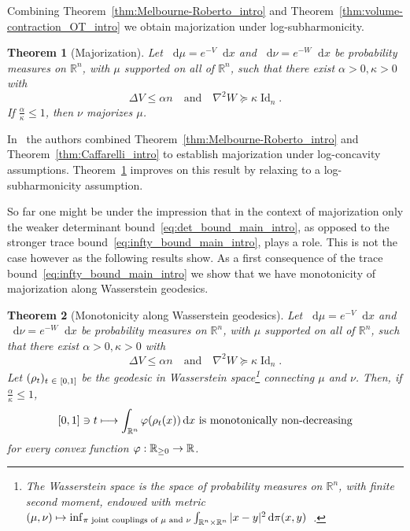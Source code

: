 \documentclass[10pt]{amsart}
\newtheorem{theo}{Theorem}[section]
\theoremstyle{definition}\newtheorem{defi}[theo]{Definition}\newtheorem{rema}[theo]{Remark}\newtheorem{exam}[theo]{Example}\newtheorem{exem}[theo]{Example}\newtheorem{nota}[theo]{Notation}
\newcommand{\R}{\mathbb R}
\DeclareMathOperator{\Id}{Id}
\newcommand{\V}{V}
\newcommand{\W}{W}
\newcommand{\dd}{n}
\newcommand{\prob}{\rho}
\newcommand{\source}{\mu}
\newcommand{\target}{\nu}
\newcommand{\lsh}{\alpha}
\newcommand{\lc}{\kappa}
\newcommand*\diff{\mathop{}\!\mathrm{d}}
\newcommand{\cxfun}{\varphi}
\renewcommand*{\to}{\mathchoice{\longrightarrow}{\rightarrow}{\rightarrow}{\rightarrow}}
\let\oldmapsto\mapsto
\renewcommand*{\mapsto}{\mathchoice{\longmapsto}{\oldmapsto}{\oldmapsto}{\oldmapsto}}
\let\oldin\in
\renewcommand{\in}{\mathchoice{\oldin}{\oldin}{\,\oldin\,}{\,\oldin\,}}
\begin{document}
Combining Theorem~\ref{thm:Melbourne-Roberto_intro} and Theorem~\ref{thm:volume-contraction_OT_intro} we obtain majorization under log-subharmonicity.

\begin{theo}[Majorization]\label{thm:majorization_intro}
Let $\diff\source=e^{-\V}\diff x$ and $\diff\target=e^{-\W}\diff x$ be probability measures on $\R^{\dd}$, with $\source$ supported on all of $\R^{\dd}$, such that there exist $\lsh>0,\lc>0$ with
\[
\Delta \V \le \lsh\dd \quad\text{and}\quad \nabla^2\W \succeq \lc \Id_{\dd}.
\]
If $\frac{\lsh}{\lc}\le 1$, then $\target$ majorizes $\source$.
\end{theo}

In~\cite{MR2023} the authors combined Theorem~\ref{thm:Melbourne-Roberto_intro} and Theorem~\ref{thm:Caffarelli_intro} to establish majorization under log-concavity assumptions. Theorem~\ref{thm:majorization_intro} improves on this result by relaxing to a log-subharmonicity assumption.

So far one might be under the impression that in the context of majorization only the weaker determinant bound~\eqref{eq:det_bound_main_intro}, as opposed to the stronger trace bound~\eqref{eq:infty_bound_main_intro}, plays a role. This is not the case however as the following results show. As a first consequence of the trace bound~\eqref{eq:infty_bound_main_intro} we show that we have monotonicity of majorization along Wasserstein geodesics.


\begin{theo}[Monotonicity along Wasserstein geodesics]\label{thm:mono_intro}
Let $\diff\source=e^{-\V}\diff x$ and $\diff\target=e^{-\W}\diff x$ be probability measures on $\R^{\dd}$, with $\source$ supported on all of $\R^{\dd}$, such that there exist $\lsh>0,\lc>0$ with
\[
\Delta \V \le \lsh\dd \quad\text{and}\quad \nabla^2\W \succeq \lc \Id_{\dd}.
\]
Let $(\prob_t)_{t\in [0,1]}$ be the geodesic in Wasserstein space\footnote{The Wasserstein space is the space of probability measures on $\R^{\dd}$, with finite second moment, endowed with metric $(\source,\target)\mapsto \inf_{\text{$\pi$ joint couplings of $\source$ and $\target$} } \int_{\R^{\dd}\times\R^{\dd}}|x-y|^2\diff\pi(x,y)$~\cite{villani2021topics}.} connecting $\source$ and $\target$. Then, if $\frac{\lsh}{\lc}\le 1$,
\begin{equation}\label{eq:mono_geo}
[0,1]\ni t\mapsto \int_{\R^{\dd}}\cxfun(\prob_t(x))\diff x\textnormal{ is monotonically non-decreasing}
\end{equation}
for every convex function $\cxfun:\R_{\ge 0}\to \R$.
\end{theo}
\end{document}
